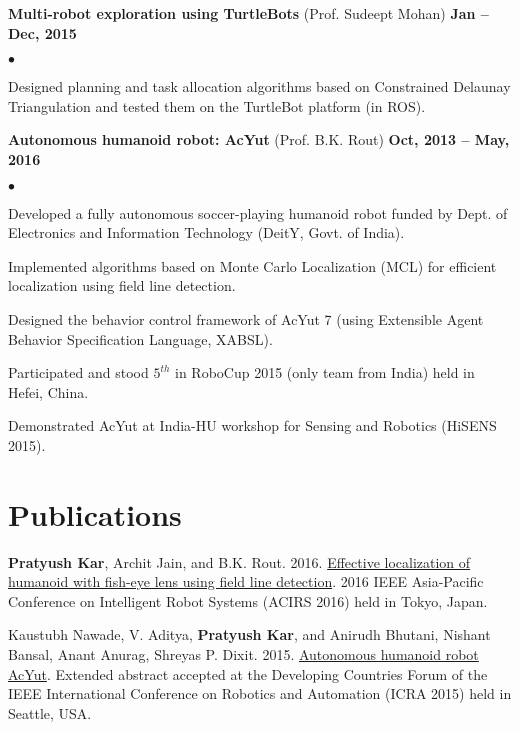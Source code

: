 \documentclass[margin,line]{res}
\newenvironment{list2}{
  \begin{list}{$\bullet$}{%
      \setlength{\itemsep}{0in}
      \setlength{\parsep}{0in} \setlength{\parskip}{0in}
      \setlength{\topsep}{0in} \setlength{\partopsep}{0in} 
      \setlength{\leftmargin}{0.2in}}}{\end{list}}
\begin{document}
\begin{resume}
\begin{minipage}{\linewidth}
{\bf Multi-robot exploration using TurtleBots} (Prof. Sudeept Mohan) \hfill {\bf Jan -- Dec, 2015}

\vspace*{.2cm}
\begin{list2}
\item Designed planning and task allocation algorithms based on Constrained Delaunay Triangulation and tested them on the TurtleBot platform (in ROS).
\end{list2}

\end{minipage}

\begin{minipage}{\linewidth}
{\bf Autonomous humanoid robot: AcYut} (Prof. B.K. Rout) \hfill {\bf Oct, 2013 -- May, 2016}

\vspace*{.2cm}
\begin{list2}
\item Developed a fully autonomous soccer-playing humanoid robot funded by Dept. of Electronics and Information Technology (DeitY, Govt. of India).
\item Implemented algorithms based on Monte Carlo Localization (MCL) for efficient localization using field line detection.
\item Designed the behavior control framework of AcYut 7 (using Extensible Agent Behavior Specification Language, XABSL).
\item Participated and stood $5^{th}$ in RoboCup 2015 (only team from India) held in Hefei, China.
\item Demonstrated AcYut at India-HU workshop for Sensing and Robotics (HiSENS 2015).
\end{list2}

\end{minipage}


\section{\sc Publications}

{\bf Pratyush Kar}, Archit Jain, and B.K. Rout. 2016. \href{http://dx.doi.org/10.1109/ACIRS.2016.7556191}{Effective localization of humanoid with fish-eye lens using field line detection}. 2016 IEEE Asia-Pacific Conference on Intelligent Robot Systems (ACIRS 2016) held in Tokyo, Japan.

Kaustubh Nawade, V. Aditya, {\bf Pratyush Kar}, and Anirudh Bhutani, Nishant Bansal, Anant Anurag, Shreyas P. Dixit. 2015. \href{https://sites.google.com/site/pratyushkar/publications/Autonomous\%20Humanoid\%20Robot\%20AcYut.pdf?attredirects=0&d=0}{Autonomous humanoid robot AcYut}. Extended abstract accepted at the Developing Countries Forum of the IEEE International Conference on Robotics and Automation (ICRA 2015) held in Seattle, USA.


\end{resume}
\end{document}

